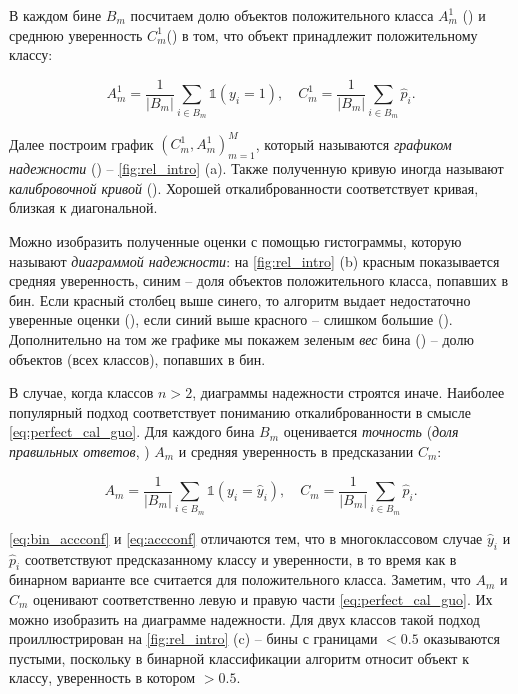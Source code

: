 \documentclass[12pt]{article}
\begin{document}
В каждом бине $B_m$ посчитаем долю объектов положительного класса $A^1_m$ () и среднюю уверенность $C^1_m$() в том, что объект принадлежит положительному классу:

\begin{equation}\label{eq:bin_accconf}
    A^1_m=\frac{1}{|B_m|}\sum_{i\in B_m} \mathbb{1}(y_i=1),
    \quad
    C^1_m=\frac{1}{|B_m|}\sum_{i\in B_m} \hat{p}_i.
\end{equation}

Далее построим график $(C^1_m, A^1_m)_{m=1}^M$, который называются \emph{графиком надежности} \cite{reldiag_idea, good_proba} () -- \autoref{fig:rel_intro} (a). Также полученную кривую иногда называют \emph{калибровочной кривой} (). Хорошей откалиброванности соответствует кривая, близкая к диагональной. 

Можно изобразить полученные оценки с помощью гистограммы, которую называют \emph{диаграммой надежности}: на \autoref{fig:rel_intro} (b) красным показывается средняя уверенность, синим -- доля объектов положительного класса, попавших в бин. Если красный столбец выше синего, то алгоритм выдает недостаточно уверенные оценки (), если синий выше красного -- слишком большие (). Дополнительно на том же графике мы покажем зеленым \emph{вес} бина () -- долю объектов (всех классов), попавших в бин. 

В случае, когда классов $n>2$, диаграммы надежности строятся иначе. Наиболее популярный подход соответствует пониманию откалиброванности в смысле \eqref{eq:perfect_cal_guo}. Для каждого бина $B_m$ оценивается \emph{точность} (\emph{доля правильных ответов}, ) $A_m$ и средняя уверенность в предсказании $C_m$:

\begin{equation}\label{eq:accconf}
    A_m=\frac{1}{|B_m|}\sum_{i\in B_m} \mathbb{1}(y_i=\hat{y}_i),
    \quad
    C_m=\frac{1}{|B_m|}\sum_{i\in B_m} \hat{p}_i.
\end{equation}

\eqref{eq:bin_accconf} и \eqref{eq:accconf} отличаются тем, что в многоклассовом случае $\hat{y}_i$ и $\hat{p}_i$ соответствуют предсказанному классу и уверенности, в то время как в бинарном варианте все считается для положительного класса.
Заметим, что $A_m$ и $C_m$ оценивают соответственно левую и правую части \eqref{eq:perfect_cal_guo}. Их можно изобразить на диаграмме надежности. Для двух классов такой подход проиллюстрирован на \autoref{fig:rel_intro} (c) -- бины с границами $<0.5$ оказываются пустыми, поскольку в бинарной классификации алгоритм относит объект к классу, уверенность в котором $>0.5$.
\end{document}
